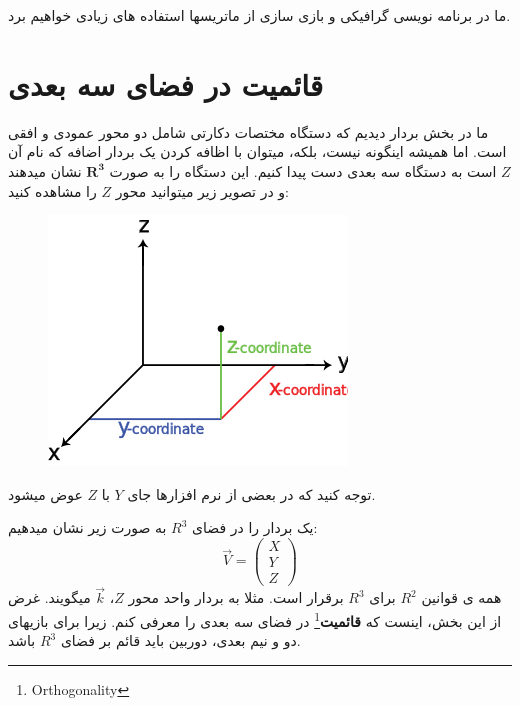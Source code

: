 \documentclass[14pt,a4paper]{memoir}
\begin{document}
	 ما در برنامه نویسی گرافیکی و بازی سازی از ماتریسها استفاده های زیادی خواهیم برد.
	 
	 \section{قائمیت در فضای سه بعدی}\label{r3}
	 
	 
	 ما در بخش بردار دیدیم که دستگاه مختصات دکارتی شامل دو محور عمودی و افقی است. اما همیشه اینگونه نیست، بلکه، میتوان با اظافه کردن یک بردار اضافه که نام آن $ Z $ است به دستگاه سه بعدی دست پیدا کنیم. این دستگاه را به صورت $ \mathbf{R^3} $ نشان میدهند و در تصویر زیر میتوانید محور $ Z $ را مشاهده کنید:
	  
	 
	\begin{figure}[h]
		\centering
		\includegraphics[scale=1]{R3}
	\end{figure}
	 
	 توجه کنید که در بعضی از نرم افزارها جای $  Y $ با $ Z $ عوض میشود.
	 
	یک بردار را در فضای $ R^3 $ به صورت زیر نشان میدهیم:
\[  \vec{V} = \begin{pmatrix}
X \\
Y \\
Z
\end{pmatrix}  \]
	 همه ی قوانین $ R^2 $ برای  $ R^3 $ برقرار است. مثلا به بردار واحد محور $ Z $، $ \vec{k} $ میگویند. غرض از این بخش، اینست که \textbf{قائمیت}\footnote{ Orthogonality} در فضای سه بعدی را معرفی کنم. زیرا برای بازیهای دو و نیم بعدی، دوربین باید قائم بر فضای $ R^3 $ باشد.
	 
	 
\end{document}
